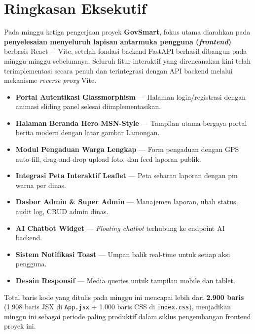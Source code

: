 \documentclass[12pt,a4paper]{article}
\begin{document}
\section{Ringkasan Eksekutif}

Pada minggu ketiga pengerjaan proyek \textbf{GovSmart}, fokus utama diarahkan pada
\textbf{penyelesaian menyeluruh lapisan antarmuka pengguna (\textit{frontend})} berbasis
React + Vite, setelah fondasi backend FastAPI berhasil dibangun pada minggu-minggu sebelumnya.
Seluruh fitur interaktif yang direncanakan kini telah terimplementasi secara penuh dan
terintegrasi dengan API backend melalui mekanisme \textit{reverse proxy} Vite.

\begin{successbox}
  \begin{itemize}[leftmargin=1.5em, itemsep=3pt]
    \item \textbf{Portal Autentikasi Glassmorphism} --- Halaman login/registrasi
          dengan animasi sliding panel selesai diimplementasikan.
    \item \textbf{Halaman Beranda Hero MSN-Style} --- Tampilan utama bergaya portal
          berita modern dengan latar gambar Lamongan.
    \item \textbf{Modul Pengaduan Warga Lengkap} --- Form pengaduan dengan GPS
          auto-fill, drag-and-drop upload foto, dan feed laporan publik.
    \item \textbf{Integrasi Peta Interaktif Leaflet} --- Peta sebaran laporan
          dengan pin warna per dinas.
    \item \textbf{Dasbor Admin \& Super Admin} --- Manajemen laporan, ubah status,
          audit log, CRUD admin dinas.
    \item \textbf{AI Chatbot Widget} --- \textit{Floating chatbot} terhubung ke
          endpoint AI backend.
    \item \textbf{Sistem Notifikasi Toast} --- Umpan balik real-time untuk setiap
          aksi pengguna.
    \item \textbf{Desain Responsif} --- Media queries untuk tampilan mobile dan tablet.
  \end{itemize}
\end{successbox}

\vspace{0.5em}
Total baris kode yang ditulis pada minggu ini mencapai lebih dari \textbf{2.900 baris}
(1.908 baris JSX di \texttt{App.jsx} + 1.000 baris CSS di \texttt{index.css}), menjadikan
minggu ini sebagai periode paling produktif dalam siklus pengembangan frontend proyek ini.
\end{document}

